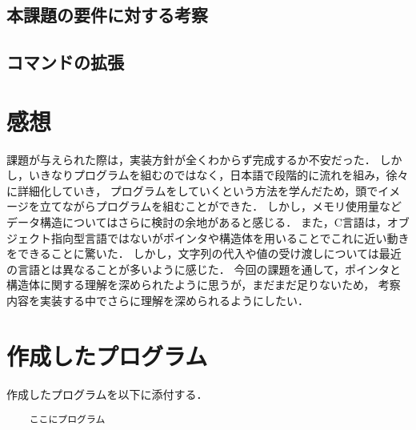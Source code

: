 \documentclass[a4j,11pt]{jarticle}
\begin{document}
\subsection{本課題の要件に対する考察}
\subsection{コマンドの拡張}

\section{感想}
課題が与えられた際は，実装方針が全くわからず完成するか不安だった．
しかし，いきなりプログラムを組むのではなく，日本語で段階的に流れを組み，徐々に詳細化していき，
プログラムをしていくという方法を学んだため，頭でイメージを立てながらプログラムを組むことができた．
しかし，メモリ使用量などデータ構造についてはさらに検討の余地があると感じる．
また，C言語は，オブジェクト指向型言語ではないがポインタや構造体を用いることでこれに近い動きをできることに驚いた．
しかし，文字列の代入や値の受け渡しについては最近の言語とは異なることが多いように感じた．
今回の課題を通して，ポインタと構造体に関する理解を深められたように思うが，まだまだ足りないため，
考察内容を実装する中でさらに理解を深められるようにしたい．
\section{作成したプログラム}\label{sec:program}

作成したプログラムを以下に添付する．

%
%
{\fontsize{10pt}{11pt} \selectfont
\begin{verbatim}
    ここにプログラム
\end{verbatim}
}

\end{document}
